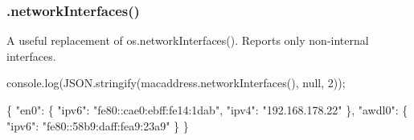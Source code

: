 \subsubsection*{{\ttfamily .network\+Interfaces()}}

A useful replacement of {\ttfamily os.\+network\+Interfaces()}. Reports only non-\/internal interfaces.


\begin{DoxyCode}
console.log(JSON.stringify(macaddress.networkInterfaces(), null, 2));
\end{DoxyCode}



\begin{DoxyCode}
\{
  "en0": \{
    "ipv6": "fe80::cae0:ebff:fe14:1dab",
    "ipv4": "192.168.178.22"
  \},
  "awdl0": \{
    "ipv6": "fe80::58b9:daff:fea9:23a9"
  \}
\}
\end{DoxyCode}
 